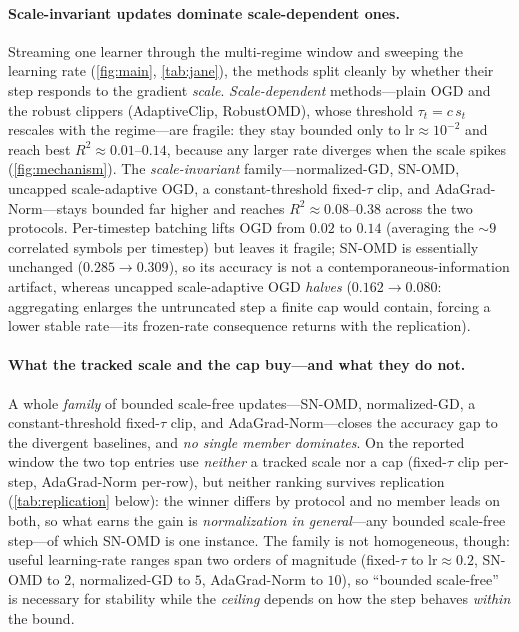 \documentclass{article}
\begin{document}
\paragraph{Scale-invariant updates dominate scale-dependent ones.} Streaming one learner
through the multi-regime window and sweeping the learning rate (\cref{fig:main},
\cref{tab:jane}), the methods split cleanly by whether their step responds to the
gradient \emph{scale}. \emph{Scale-dependent} methods---plain OGD and the robust clippers
(AdaptiveClip, RobustOMD), whose threshold $\tau_t=c\,s_t$ rescales with the regime---are
fragile: they stay bounded only to $\mathrm{lr}\approx10^{-2}$ and reach best
$R^2\approx0.01$--$0.14$, because any larger rate diverges when the scale spikes
(\cref{fig:mechanism}). The \emph{scale-invariant} family---normalized-GD, SN-OMD, uncapped
scale-adaptive OGD, a constant-threshold fixed-$\tau$ clip, and AdaGrad-Norm---stays bounded
far higher and reaches $R^2\approx0.08$--$0.38$ across the two protocols. Per-timestep batching
lifts OGD from $0.02$ to $0.14$ (averaging the $\sim\!9$ correlated symbols per timestep) but
leaves it fragile; SN-OMD is essentially unchanged ($0.285\to0.309$), so its accuracy is not a
contemporaneous-information artifact, whereas uncapped scale-adaptive OGD \emph{halves}
($0.162\to0.080$: aggregating enlarges the untruncated step a finite cap would contain, forcing
a lower stable rate---its frozen-rate consequence returns with the replication).

\paragraph{What the tracked scale and the cap buy---and what they do not.}
A whole \emph{family} of bounded scale-free updates---SN-OMD, normalized-GD, a
constant-threshold fixed-$\tau$ clip, and AdaGrad-Norm---closes the accuracy gap to the
divergent baselines, and \emph{no single member dominates}. On the reported window the two top
entries use \emph{neither} a tracked scale nor a cap (fixed-$\tau$ clip per-step, AdaGrad-Norm
per-row), but neither ranking survives replication (\cref{tab:replication} below): the winner
differs by protocol and no member leads on both, so what earns the gain is \emph{normalization
in general}---any bounded scale-free step---of which SN-OMD is one instance. The family is not
homogeneous, though: useful learning-rate ranges span two orders
of magnitude (fixed-$\tau$ to $\mathrm{lr}\!\approx\!0.2$, SN-OMD to $2$, normalized-GD to $5$,
AdaGrad-Norm to $10$), so ``bounded scale-free'' is necessary for stability while the
\emph{ceiling} depends on how the step behaves \emph{within} the bound.
\end{document}
